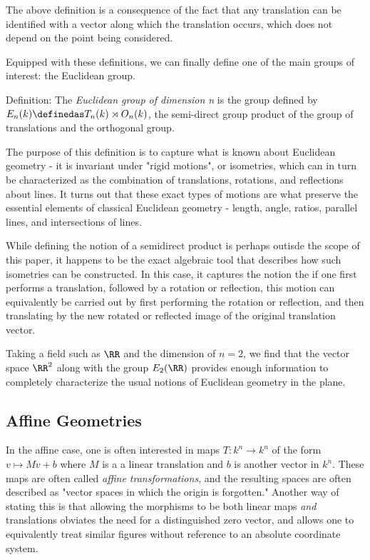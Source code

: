 \documentclass[]{article}
\begin{document}
The above definition is a consequence of the fact that any translation
can be identified with a vector along which the translation occurs,
which does not depend on the point being considered.

Equipped with these definitions, we can finally define one of the main
groups of interest: the Euclidean group.

Definition: The \emph{Euclidean group of dimension n} is the group
defined by \(E_n(k) \definedas T_n(k) \rtimes O_n(k)\), the semi-direct
group product of the group of translations and the orthogonal group.

The purpose of this definition is to capture what is known about
Euclidean geometry - it is invariant under "rigid motions", or
isometries, which can in turn be characterized as the combination of
translations, rotations, and reflections about lines. It turns out that
these exact types of motions are what preserve the essential elements of
classical Euclidean geometry - length, angle, ratios, parallel lines,
and intersections of lines.

While defining the notion of a semidirect product is perhaps outisde the
scope of this paper, it happens to be the exact algebraic tool that
describes how such isometries can be constructed. In this case, it
captures the notion the if one first performs a translation, followed by
a rotation or reflection, this motion can equivalently be carried out by
first performing the rotation or reflection, and then translating by the
new rotated or reflected image of the original translation vector.

Taking a field such as \(\RR\) and the dimension of \(n=2\), we find
that the vector space \(\RR^2\) along with the group \(E_2(\RR)\)
provides enough information to completely characterize the usual notions
of Euclidean geometry in the plane.

\subsection{Affine Geometries}\label{header-n72}

In the affine case, one is often interested in maps
\(T: k^n \rightarrow k^n\) of the form \(v \mapsto Mv + b\) where \(M\)
is a a linear translation and \(b\) is another vector in \(k^n\). These
maps are often called \emph{affine transformations}, and the resulting
spaces are often described as "vector spaces in which the origin is
forgotten." Another way of stating this is that allowing the morphisms
to be both linear maps \emph{and} translations obviates the need for a
distinguished zero vector, and allows one to equivalently treat similar
figures without reference to an absolute coordinate system.
\end{document}
